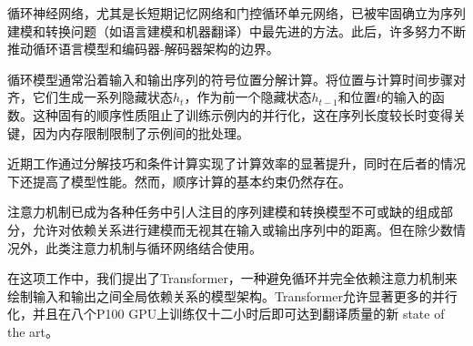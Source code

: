 循环神经网络，尤其是长短期记忆网络\citep{hochreiter1997}和门控循环单元网络\citep{gruEval14}，已被牢固确立为序列建模和转换问题（如语言建模和机器翻译）中最先进的方法\citep{sutskever14, bahdanau2014neural, cho2014learning}。此后，许多努力不断推动循环语言模型和编码器-解码器架构的边界\citep{wu2016google,luong2015effective,jozefowicz2016exploring}。

循环模型通常沿着输入和输出序列的符号位置分解计算。将位置与计算时间步骤对齐，它们生成一系列隐藏状态$h_t$，作为前一个隐藏状态$h_{t-1}$和位置$t$的输入的函数。这种固有的顺序性质阻止了训练示例内的并行化，这在序列长度较长时变得关键，因为内存限制限制了示例间的批处理。

近期工作通过分解技巧\citep{Kuchaiev2017Factorization}和条件计算\citep{shazeer2017outrageously}实现了计算效率的显著提升，同时在后者的情况下还提高了模型性能。然而，顺序计算的基本约束仍然存在。


注意力机制已成为各种任务中引人注目的序列建模和转换模型不可或缺的组成部分，允许对依赖关系进行建模而无视其在输入或输出序列中的距离\citep{bahdanau2014neural, structuredAttentionNetworks}。但在除少数情况外\citep{decomposableAttnModel}，此类注意力机制与循环网络结合使用。


在这项工作中，我们提出了Transformer，一种避免循环并完全依赖注意力机制来绘制输入和输出之间全局依赖关系的模型架构。Transformer允许显著更多的并行化，并且在八个P100 GPU上训练仅十二小时后即可达到翻译质量的新 state of the art。

